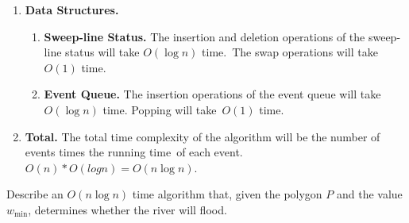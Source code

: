 \documentclass[11pt]{article}
\begin{document}
\begin{solution}
\begin{enumerate}
\begin{enumerate}
          for each of it's edges, left and right, so \(2n = O(n)\) events. Each circle can only\
          intersect with another circle a maximum of two times. Therefore, the number of events for\
          intersections can be no more than \(\sum_{i=1}^{n} 2(n-i) = O(n)\). Therefore, events take\
          a total of \(O(n)\) time.
        \item \textbf{Data Structures.}
          \begin{enumerate}
            \item \textbf{Sweep-line Status.}
              The insertion and deletion operations of the sweep-line status will take \(O(\log n)\) time.\
              The swap operations will take \(O(1)\) time.
            \item \textbf{Event Queue.}
              The insertion operations of the event queue will take \(O(\log n)\) time. Popping will take\
              \(O(1)\) time.
          \end{enumerate}
        \item \textbf{Total.}
          The total time complexity of the algorithm will be the number of events times the running time\
          of each event. \(O(n) * O(log n) = O(n \log n)\).
      \end{enumerate}
  \end{enumerate}
\end{solution}

\HomeworkHeader{1}{3}%
Describe an \(O(n \log n)\) time algorithm that, given the polygon \(P\) and the value \(w_{\min}\),
determines whether the river will flood.
\end{document}
